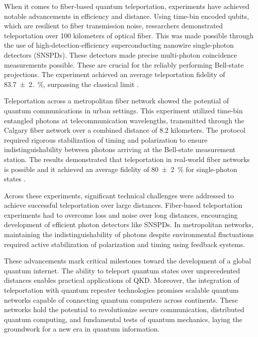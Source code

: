 When it comes to fiber-based quantum teleportation, experiments have achieved notable advancements in efficiency and distance. Using time-bin encoded qubits, which are resilient to fiber transmission noise, researchers demonstrated teleportation over 100 kilometers of optical fiber. This was made possible through the use of high-detection-efficiency superconducting nanowire single-photon detectors (SNSPDs). These detectors made precise multi-photon coincidence measurements possible. These are crucial for the reliably performing Bell-state projections. The experiment achieved an average teleportation fidelity of \SI{83.7(2.0)}{\percent}, surpassing the classical limit \cite{Takesue:2015}.

Teleportation across a metropolitan fiber network showed the potential of quantum communications in urban settings. This experiment utilized time-bin entangled photons at telecommunication wavelengths, transmitted through the Calgary fiber network over a combined distance of 8.2 kilometers. The protocol required rigorous stabilization of timing and polarization to ensure indistinguishability between photons arriving at the Bell-state measurement station. The results demonstrated that teleportation in real-world fiber networks is possible and it achieved an average fidelity of \SI{80(2)}{\percent} for single-photon states \cite{Valivarthi:2016}.

Across these experiments, significant technical challenges were addressed to achieve successful teleportation over large distances. Fiber-based teleportation experiments had to overcome loss and noise over long distances, encouraging development of efficient photon detectors like SNSPDs. In metropolitan networks, maintaining the indistinguishability of photons despite environmental fluctuations required active stabilization of polarization and timing using feedback systems.\cite{Valivarthi:2016}

These advancements mark critical milestones toward the development of a global quantum internet. The ability to teleport quantum states over unprecedented distances enables practical applications of QKD. Moreover, the integration of teleportation with quantum repeater technologies promises scalable quantum networks capable of connecting quantum computers across continents. These networks hold the potential to revolutionize secure communication, distributed quantum computing, and fundamental tests of quantum mechanics, laying the groundwork for a new era in quantum information.\cite{Valivarthi:2016}

